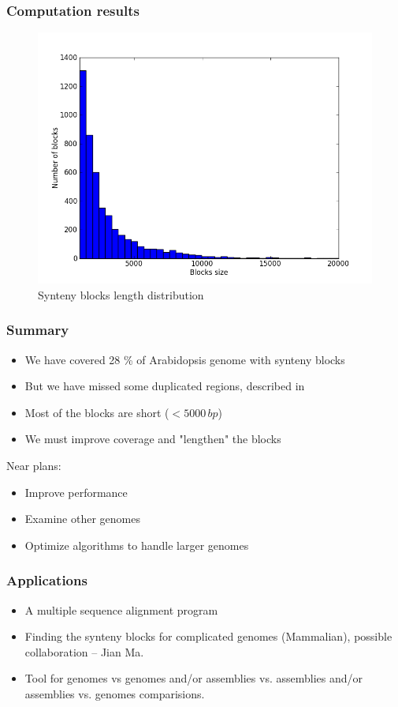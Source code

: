 \documentclass[svgnames,14pt]{beamer}
\begin{document}
\begin{frame}
\frametitle{Computation results}
\begin{figure}
\centering
\includegraphics[scale = 0.480]{blocks_len_distrib.png}
\small \caption{Synteny blocks length distribution}
\end{figure}
\end{frame}

\begin{frame}
\frametitle{Summary}
\begin{itemize}
\item We have covered 28 \% of Arabidopsis genome with synteny blocks
\item But we have missed some duplicated regions, described in 
\item Most of the blocks are short (\(< 5000 \,  bp\))
\item We must improve coverage and "lengthen" the blocks
\end{itemize}
\pause
Near plans:
\begin{itemize}
\item Improve performance
\item Examine other genomes
\item Optimize algorithms to handle larger genomes
\end{itemize}
\end{frame}

\begin{frame}
\frametitle{Applications}
\begin{itemize}
\item A multiple sequence alignment program
\item Finding the synteny blocks for complicated genomes (Mammalian),
possible collaboration -- Jian Ma.
\item Tool for genomes vs genomes and/or assemblies vs.
assemblies and/or assemblies vs. genomes comparisions.
\end{itemize}
\end{frame}
\end{document}
